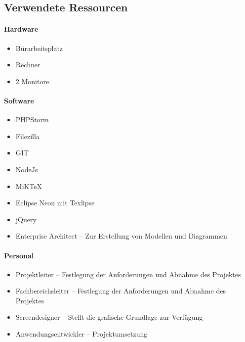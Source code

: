 \subsection{Verwendete Ressourcen}
\label{list:Ressourcenplanung}

\paragraph{Hardware}
\begin{itemize}
	\item Bürarbeitsplatz
	\item Rechner
	\item 2 Monitore
\end{itemize}

\paragraph{Software}
\begin{itemize}
	\item PHPStorm
	\item Filezilla
	\item GIT
	\item NodeJs
	\item MiKTeX
	\item Eclipse Neon mit Texlipse
	\item jQuery
	\item Enterprise Architect – Zur Erstellung von Modellen und Diagrammen

\end{itemize}

\paragraph{Personal}
\begin{itemize}
	\item Projektleiter -- Festlegung der Anforderungen und Abnahme des Projektes

	\item Fachbereichsleiter -- Festlegung der Anforderungen und Abnahme des
	Projektes
	\item Screendesigner -- Stellt die grafische Grundlage zur Verfügung
	\item Anwendungsentwickler -- Projektumsetzung
\end{itemize}